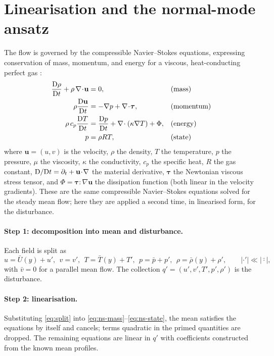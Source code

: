 \documentclass[11pt]{article}
\begin{document}
\section{Linearisation and the normal-mode ansatz}\label{sec:lin}
The flow is governed by the compressible Navier--Stokes equations, expressing conservation of mass,
momentum, and energy for a viscous, heat-conducting perfect gas \cite{white2006}:
\begin{align}
  \frac{\mathrm{D}\rho}{\mathrm{D} t}+\rho\,\nabla\!\cdot\!\mathbf u &= 0, &&\text{(mass)}\label{eq:ns-mass}\\
  \rho\frac{\mathrm{D}\mathbf u}{\mathrm{D} t} &= -\nabla p+\nabla\!\cdot\!\boldsymbol\tau, &&\text{(momentum)}\label{eq:ns-mom}\\
  \rho\,c_p\frac{\mathrm{D} T}{\mathrm{D} t} &= \frac{\mathrm{D} p}{\mathrm{D} t}+\nabla\!\cdot(\kappa\nabla T)+\Phi, &&\text{(energy)}\label{eq:ns-energy}\\
  p &= \rho R T, &&\text{(state)}\label{eq:ns-state}
\end{align}
where $\mathbf u=(u,v)$ is the velocity, $\rho$ the density, $T$ the temperature, $p$ the pressure,
$\mu$ the viscosity, $\kappa$ the conductivity, $c_p$ the specific heat, $R$ the gas constant,
$\mathrm{D}/\mathrm{D} t=\partial_t+\mathbf u\!\cdot\!\nabla$ the material derivative, $\boldsymbol\tau$ the Newtonian
viscous stress tensor, and $\Phi=\boldsymbol\tau\!:\!\nabla\mathbf u$ the dissipation function (both
linear in the velocity gradients). These are the same compressible Navier--Stokes equations solved
for the steady mean flow; here they are applied a second time, in linearised form, for the disturbance.

\paragraph{Step 1: decomposition into mean and disturbance.} Each field is split as
\begin{equation}\label{eq:split}
  u=\bar U(y)+u',\ \ v=v',\ \ T=\bar T(y)+T',\ \ p=\bar p+p',\ \ \rho=\bar\rho(y)+\rho',\qquad
  |\cdot'|\ll|\bar\cdot|,
\end{equation}
with $\bar v=0$ for a parallel mean flow. The collection $q'=(u',v',T',p',\rho')$ is the disturbance.

\paragraph{Step 2: linearisation.} Substituting \eqref{eq:split} into
\eqref{eq:ns-mass}--\eqref{eq:ns-state}, the mean satisfies the equations by itself and cancels; terms
quadratic in the primed quantities are dropped. The remaining equations are linear in $q'$ with
coefficients constructed from the known mean profiles.
\end{document}
